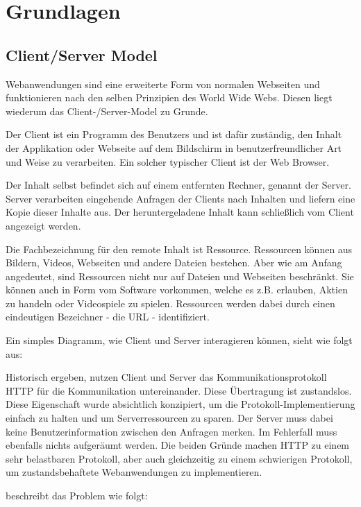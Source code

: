 \chapter{Grundlagen}

\section{Client/Server Model}
\label{sec:client_server}

Webanwendungen sind eine erweiterte Form von normalen Webseiten und funktionieren nach den selben Prinzipien des World Wide Webs. Diesen liegt wiederum das Client-/Server-Model zu Grunde.

Der Client ist ein Programm des Benutzers und ist dafür zuständig, den Inhalt der Applikation oder Webseite auf dem Bildschirm in benutzerfreundlicher Art und Weise zu verarbeiten. Ein solcher typischer Client ist der Web Browser.

Der Inhalt selbst befindet sich auf einem entfernten Rechner, genannt der Server. Server verarbeiten eingehende Anfragen der Clients nach Inhalten und liefern eine Kopie dieser Inhalte aus. Der heruntergeladene Inhalt kann schließlich vom Client angezeigt werden.

Die Fachbezeichnung für den remote Inhalt ist Ressource. Ressourcen können aus Bildern, Videos, Webseiten und andere Dateien bestehen. Aber wie am Anfang angedeutet, sind Ressourcen nicht nur auf Dateien und Webseiten beschränkt. Sie können auch in Form vom Software vorkommen, welche es z.B. erlauben, Aktien zu handeln oder Videospiele zu spielen. Ressourcen werden dabei durch einen eindeutigen Bezeichner - die URL - identifiziert.

Ein simples Diagramm, wie Client und Server interagieren können, sieht wie folgt aus:

Historisch ergeben, nutzen Client und Server das Kommunikationsprotokoll HTTP für die Kommunikation untereinander. Diese Übertragung ist zustandslos. Diese Eigenschaft wurde absichtlich konzipiert, um die Protokoll-Implementierung einfach zu halten und um Serverressourcen zu sparen. Der Server muss dabei keine Benutzerinformation zwischen den Anfragen merken. Im Fehlerfall muss ebenfalls nichts aufgeräumt werden. Die beiden Gründe machen HTTP zu einem sehr belastbaren Protokoll, aber auch gleichzeitig zu einem schwierigen Protokoll, um zustandsbehaftete Webanwendungen zu implementieren.

\cite[Background]{Parikh:2015} beschreibt das Problem wie folgt:

